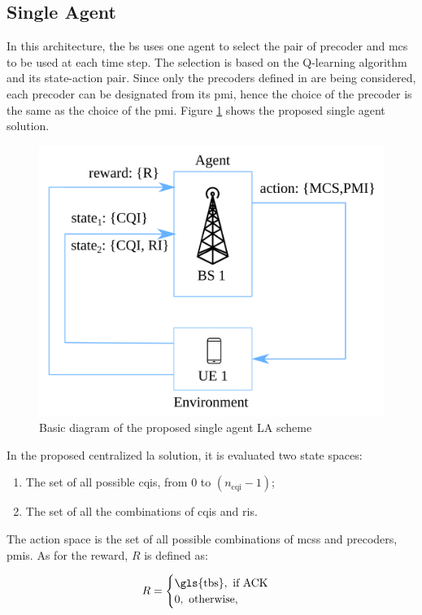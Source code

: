 \subsection{Single Agent}
\label{subsec:single-agent}

In this architecture, the \gls{bs} uses one agent to select the pair of precoder and \gls{mcs} to be used at each time step.
%
The selection is based on the Q-learning algorithm and its state-action pair.
%
Since only the precoders defined in \cite{3gpp.38.214} are being considered, each precoder can be designated from its \gls{pmi}, hence the choice of the precoder is the same as the choice of the \gls{pmi}.
%
Figure \ref{fig:la-rl-frame-sa} shows the proposed single agent solution.


\begin{figure}[!hb]
	\centerline{\includegraphics[width=0.7\columnwidth]{figures/chp_la/rl-framework-mateus_sa.png}}
	\caption{Basic diagram of the proposed single agent LA scheme}
	\label{fig:la-rl-frame-sa}
\end{figure}

In the proposed centralized \gls{la} solution, it is evaluated two state spaces:
\begin{enumerate}
    \item The set of all possible \gls{cqi}s, from $0$ to $(n_{\text{cqi}}-1)$;
    \item The set of all the combinations of \glspl{cqi} and \glspl{ri}.
\end{enumerate}
%
The action space is the set of all possible combinations of \glspl{mcs} and precoders, \glspl{pmi}.
%
As for the reward, $R$ is defined as:

\begin{equation}\label{eq.:la-reward-sa}
    R = \begin{cases}
    \textrm{\gls{tbs}}, \text{ if ACK} \\
    0, \text{ otherwise,}
    \end{cases}
\end{equation}

